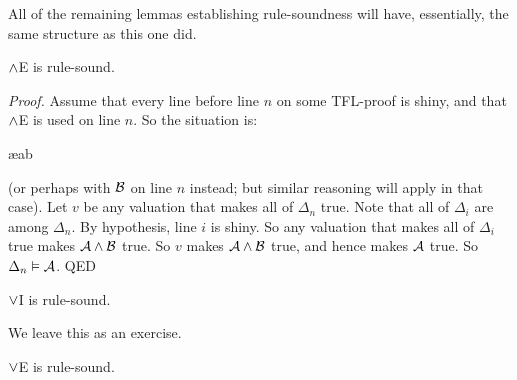 All of the remaining lemmas establishing rule-soundness will have, essentially, the same structure as this one did. 

\begin{factoidboxe}$\wedge$E is rule-sound.
\end{factoidboxe}

\emph{Proof.}
	Assume that every line before line $n$ on some TFL-proof is shiny, and that $\wedge$E is used on line $n$. So the situation is:
		   \begin{fitchproof}
			    \ae{ab}
		   \end{fitchproof}\noindent
(or perhaps with $\mathcal{B}$ on line $n$ instead; but similar reasoning will apply in that case). Let $v$ be any valuation that makes all of $\Delta_{n}$ true. Note that all of $\Delta_i$ are among $\Delta_{n}$. By hypothesis, line $i$ is shiny. So any valuation that makes all of $\Delta_i$ true makes $\mathcal{A}\wedge\mathcal{B}$ true. So $v$ makes $\mathcal{A}\wedge\mathcal{B}$ true, and hence makes $\mathcal{A}$ true. So $\Delta_{n} \vDash \mathcal{A}$. QED


\begin{factoidboxe}$\vee$I is rule-sound.
\end{factoidboxe}

We leave this as an exercise.

\begin{factoidboxe}$\vee$E is rule-sound.
\end{factoidboxe}


